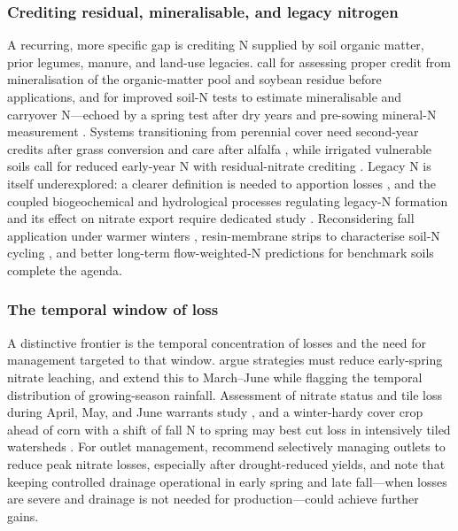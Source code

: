 \documentclass[11pt]{article}
\begin{document}
\subsubsection{Crediting residual, mineralisable, and legacy nitrogen}

A recurring, more specific gap is crediting N supplied by soil organic matter,
prior legumes, manure, and land-use legacies. \textcite{Bakhsh2007,Bakhsh2005}
call for assessing proper credit from mineralisation of the organic-matter pool
and soybean residue before applications, and \textcite{Randall2001} for improved
soil-N tests to estimate mineralisable and carryover N---echoed by a spring test
after dry years \parencite{RANDALL1995} and pre-sowing mineral-N measurement
\parencite{Conrad2009}. Systems transitioning from perennial cover need
second-year credits after grass conversion \parencite{Huggins2001} and care
after alfalfa \parencite{ROBBINS1980}, while irrigated vulnerable soils call for
reduced early-year N with residual-nitrate crediting \parencite{Derby2009}.
Legacy N is itself underexplored: a clearer definition is needed to apportion
losses \parencite{Williams2022}, and the coupled biogeochemical and hydrological
processes regulating legacy-N formation and its effect on nitrate export require
dedicated study \parencite{Hu2024}. Reconsidering fall application under warmer
winters \parencite{Gentry2014}, resin-membrane strips to characterise soil-N
cycling \parencite{Masri2024}, and better long-term flow-weighted-N predictions
for benchmark soils \parencite{Skaggs2012} complete the agenda.

\subsubsection{The temporal window of loss}

A distinctive frontier is the temporal concentration of losses and the need for
management targeted to that window. \textcite{Bakhsh2007} argue strategies must
reduce early-spring nitrate leaching, and \textcite{Bakhsh2010} extend this to
March--June while flagging the temporal distribution of growing-season rainfall.
Assessment of nitrate status and tile loss during April, May, and June warrants
study \parencite{Nance2007}, and a winter-hardy cover crop ahead of corn with a
shift of fall N to spring may best cut loss in intensively tiled watersheds
\parencite{Gentry2024}. For outlet management, \textcite{Skaggs1995} recommend
selectively managing outlets to reduce peak nitrate losses, especially after
drought-reduced yields, and \textcite{Elmi2004,Elmi2002} note that keeping
controlled drainage operational in early spring and late fall---when losses are
severe and drainage is not needed for production---could achieve further gains.
\end{document}

